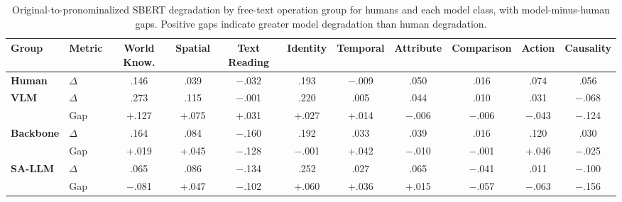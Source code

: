 \begin{table}[h]
\small\centering
\setlength{\tabcolsep}{4pt}

\begin{tabular}{llccccccccc}
\toprule
\textbf{Group} & \textbf{Metric} & \textbf{World Know.} & \textbf{Spatial} & \textbf{Text Reading} & \textbf{Identity} & \textbf{Temporal} & \textbf{Attribute} & \textbf{Comparison} & \textbf{Action} & \textbf{Causality} \\
\midrule
\textbf{Human} & $\Delta$ & .146 & .039 & $-$.032 & .193 & $-$.009 & .050 & .016 & .074 & .056 \\
\midrule
\textbf{VLM} & $\Delta$ & .273 & .115 & $-$.001 & .220 & .005 & .044 & .010 & .031 & $-$.068 \\
 & Gap & \textcolor[HTML]{CC7A00}{+.127} & \textcolor[HTML]{CC7A00}{+.075} & \textcolor[HTML]{CC7A00}{+.031} & \textcolor[HTML]{CC7A00}{+.027} & \textcolor[HTML]{CC7A00}{+.014} & \textcolor[HTML]{0072B2}{$-$.006} & \textcolor[HTML]{0072B2}{$-$.006} & \textcolor[HTML]{0072B2}{$-$.043} & \textcolor[HTML]{0072B2}{$-$.124} \\
\midrule
\textbf{Backbone} & $\Delta$ & .164 & .084 & $-$.160 & .192 & .033 & .039 & .016 & .120 & .030 \\
 & Gap & \textcolor[HTML]{CC7A00}{+.019} & \textcolor[HTML]{CC7A00}{+.045} & \textcolor[HTML]{0072B2}{$-$.128} & \textcolor[HTML]{0072B2}{$-$.001} & \textcolor[HTML]{CC7A00}{+.042} & \textcolor[HTML]{0072B2}{$-$.010} & \textcolor[HTML]{0072B2}{$-$.001} & \textcolor[HTML]{CC7A00}{+.046} & \textcolor[HTML]{0072B2}{$-$.025} \\
\midrule
\textbf{SA-LLM} & $\Delta$ & .065 & .086 & $-$.134 & .252 & .027 & .065 & $-$.041 & .011 & $-$.100 \\
 & Gap & \textcolor[HTML]{0072B2}{$-$.081} & \textcolor[HTML]{CC7A00}{+.047} & \textcolor[HTML]{0072B2}{$-$.102} & \textcolor[HTML]{CC7A00}{+.060} & \textcolor[HTML]{CC7A00}{+.036} & \textcolor[HTML]{CC7A00}{+.015} & \textcolor[HTML]{0072B2}{$-$.057} & \textcolor[HTML]{0072B2}{$-$.063} & \textcolor[HTML]{0072B2}{$-$.156} \\
\bottomrule
\end{tabular}
\caption{Original-to-pronominalized SBERT degradation by free-text operation group for humans and each model class, with model-minus-human gaps. Positive gaps indicate greater model degradation than human degradation.}
\label{tab:op_degradation_gap}
\end{table}
